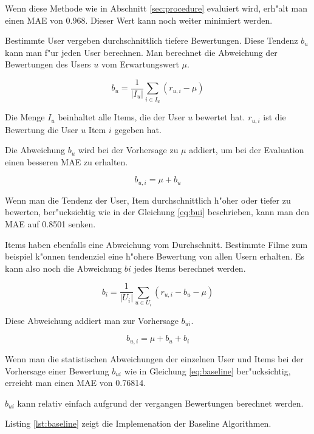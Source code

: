 \documentclass[a4paper, 12pt]{article}
\begin{document}
Wenn diese Methode wie in Abschnitt \ref{sec:procedure} evaluiert wird, erh"alt man einen MAE von 0.968. Dieser Wert kann noch weiter minimiert werden.

Bestimmte User vergeben durchschnittlich tiefere Bewertungen. Diese Tendenz $b_u$ kann man f"ur jeden User berechnen. Man berechnet die Abweichung der Bewertungen des Users $u$ vom Erwartungswert $\mu$.

\begin{equation}
  b_u = \frac{1}{|I_u|}\sum_{i \in I_u}(r_{u,i} - \mu)
\end{equation}

Die Menge $I_u$ beinhaltet alle Items, die der User $u$ bewertet hat. $r_{u,i}$ ist die Bewertung die User $u$ Item $i$ gegeben hat.

Die Abweichung $b_u$ wird bei der Vorhersage zu $\mu$ addiert, um bei der Evaluation einen besseren MAE zu erhalten.

\begin{equation}
  \label{eq:bui}
  b_{u,i} = \mu + b_u
\end{equation}

Wenn man die Tendenz der User, Item durchschnittlich h"oher oder tiefer zu bewerten, ber"ucksichtig wie in der Gleichung \ref{eq:bui} beschrieben, kann man den MAE auf 0.8501 senken. 

Items haben ebenfalls eine Abweichung vom Durchschnitt. Bestimmte Filme zum beispiel k"onnen tendenziel eine h"ohere Bewertung von allen Usern erhalten. Es kann also noch die Abweichung $bi$ jedes Items berechnet werden.

\begin{equation}
  \label{eq:bi}
  b_i = \frac{1}{|U_i|}\sum_{u \in U_i}(r_{u,i} - b_u - \mu)
\end{equation}

Diese Abweichung addiert man zur Vorhersage $b_{ui}$.

\begin{equation}
  \label{eq:baseline}
  b_{u,i} = \mu + b_u + b_i
\end{equation}

Wenn man die statistischen Abweichungen der einzelnen User und Items bei der Vorhersage einer Bewertung $b_{ui}$ wie in Gleichung \ref{eq:baseline} ber"ucksichtig, erreicht man einen MAE von 0.76814.

$b_{ui}$ kann relativ einfach aufgrund der vergangen Bewertungen berechnet werden.

Listing \ref{lst:baseline} zeigt die Implemenation der Baseline Algorithmen.
\end{document}
